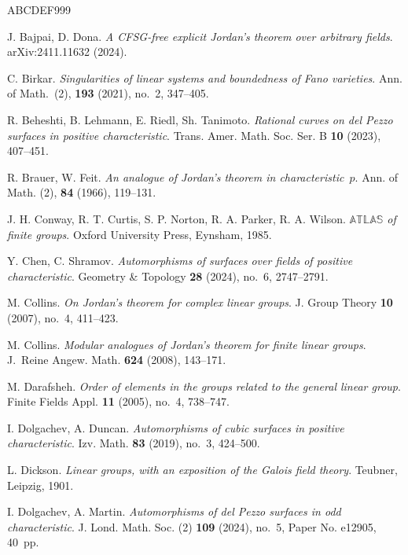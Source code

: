 \documentclass[12pt]{amsart}
\numberwithin{equation}{section}
\theoremstyle{definition}
\begin{document}
\begin{thebibliography}{ABCDEF999}

J. Bajpai, D. Dona. \emph{A CFSG-free explicit Jordan's theorem over arbitrary fields}.
arXiv:2411.11632 (2024).

C. Birkar.
\emph{Singularities of linear systems and boundedness of Fano varieties}.
Ann. of Math.~(2), \textbf{193} (2021), no.~2, 347--405.

R. Beheshti, B. Lehmann, E. Riedl, Sh. Tanimoto.
\emph{Rational curves on del Pezzo surfaces in positive characteristic}.
Trans. Amer. Math. Soc. Ser. B \textbf{10} (2023), 407--451.

R. Brauer, W. Feit. \emph{An analogue of Jordan's theorem
in characteristic~$p$}.
Ann. of Math. (2), \textbf{84} (1966), 119--131.

J. H. Conway, R. T. Curtis, S. P. Norton, R. A. Parker, R. A. Wilson.
\emph{$\mathbb{ATLAS}$ of finite groups}.
Oxford University Press, Eynsham, 1985.

Y. Chen, C. Shramov. \emph{Automorphisms of surfaces over fields of positive characteristic}.
Geometry \& Topology \textbf{28} (2024), no.~6, 2747--2791.

M. Collins. \emph{On Jordan's theorem for complex linear groups}. J. Group Theory \textbf{10}  (2007), no.~4, 411--423.

M. Collins. \emph{Modular analogues of Jordan's theorem for finite linear groups}.
J.~Reine Angew. Math. \textbf{624} (2008), 143--171.

M. Darafsheh. \emph{Order of elements in the groups
related to the general linear group}. Finite Fields Appl. \textbf{11} (2005),
no.~4, 738--747.

I. Dolgachev, A. Duncan. \emph{Automorphisms of cubic surfaces
in positive characteristic}.
Izv. Math. \textbf{83} (2019), no.~3, 424--500.

L. Dickson. \emph{Linear groups, with an exposition of the Galois field theory}.
Teubner, Leipzig, 1901.


I. Dolgachev, A. Martin. \emph{Automorphisms of del Pezzo surfaces in odd characteristic}.
J. Lond. Math. Soc. (2) \textbf{109} (2024), no.~5, Paper No. e12905, 40~pp.


\end{thebibliography}
\end{document}
